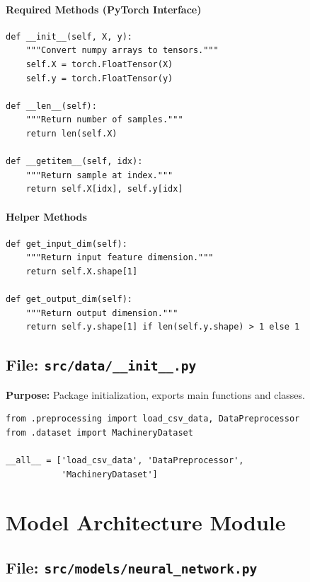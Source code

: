 \documentclass[11pt,a4paper]{article}
\begin{document}
\paragraph{Required Methods (PyTorch Interface)}

\begin{lstlisting}
def __init__(self, X, y):
    """Convert numpy arrays to tensors."""
    self.X = torch.FloatTensor(X)
    self.y = torch.FloatTensor(y)

def __len__(self):
    """Return number of samples."""
    return len(self.X)

def __getitem__(self, idx):
    """Return sample at index."""
    return self.X[idx], self.y[idx]
\end{lstlisting}

\paragraph{Helper Methods}

\begin{lstlisting}
def get_input_dim(self):
    """Return input feature dimension."""
    return self.X.shape[1]

def get_output_dim(self):
    """Return output dimension."""
    return self.y.shape[1] if len(self.y.shape) > 1 else 1
\end{lstlisting}

\subsection{File: \texttt{src/data/\_\_init\_\_.py}}

\textbf{Purpose:} Package initialization, exports main functions and classes.

\begin{lstlisting}
from .preprocessing import load_csv_data, DataPreprocessor
from .dataset import MachineryDataset

__all__ = ['load_csv_data', 'DataPreprocessor',
           'MachineryDataset']
\end{lstlisting}

\newpage
\section{Model Architecture Module}

\subsection{File: \texttt{src/models/neural\_network.py}}
\end{document}
